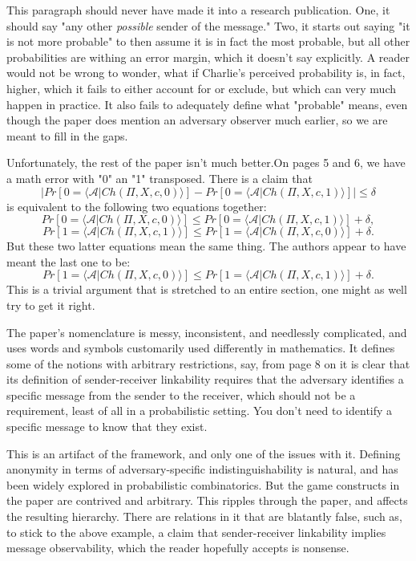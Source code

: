 \documentclass{article}
\begin{document}
\bigskip

This paragraph should never have made it into a research publication. One, it should say "any other \textit{possible} sender of the message." Two, it starts out saying "it is not more probable" to then assume it is in fact the most probable, but all other probabilities are withing an error margin, which it doesn't say explicitly. A reader would not be wrong to wonder, what if Charlie's perceived probability is, in fact, higher, which it fails to either account for or exclude, but which can very much happen in practice. It also fails to adequately define what "probable" means, even though the paper does mention an adversary observer much earlier, so we are meant to fill in the gaps. 

Unfortunately, the rest of the paper isn't much better.On pages 5 and 6, we have a math error with "0" an "1" transposed. There is a claim that $$\left| Pr[0=\langle\mathcal{A}|Ch(\Pi,X,c,0) \rangle]-Pr[0=\langle\mathcal{A}|Ch(\Pi,X,c,1) \rangle]\right|\leq\delta$$ is equivalent to the following two equations together: $$ Pr[0=\langle\mathcal{A}|Ch(\Pi,X,c,0) \rangle]\leq Pr[0=\langle\mathcal{A}|Ch(\Pi,X,c,1) \rangle]+\delta,$$
$$ Pr[1=\langle\mathcal{A}|Ch(\Pi,X,c,1) \rangle]\leq Pr[1=\langle\mathcal{A}|Ch(\Pi,X,c,0) \rangle]+\delta.$$ But these two latter equations mean the same thing. The authors appear to have meant the last one to be:  $$ Pr[1=\langle\mathcal{A}|Ch(\Pi,X,c,0) \rangle]\leq Pr[1=\langle\mathcal{A}|Ch(\Pi,X,c,1) \rangle]+\delta.$$ This is a trivial argument that is stretched to an entire section, one might as well try to get it right. \medskip

\noindent The paper's nomenclature is messy, inconsistent, and needlessly complicated, and uses words and symbols customarily used differently in mathematics. It defines some of the notions with arbitrary restrictions, say, from page 8 on it is clear that its definition of sender-receiver linkability requires that the adversary identifies a specific message from the sender to the receiver, which should not be a requirement, least of all in a probabilistic setting. You don't need to identify a specific message to know that they exist.

This is an artifact of the framework, and only one of the issues with it. Defining anonymity in terms of adversary-specific indistinguishability is natural, and has been widely explored in probabilistic combinatorics. But the game constructs in the paper are contrived and arbitrary. This ripples through the paper, and affects the resulting hierarchy. There are relations in it that are blatantly false, such as, to stick to the above example, a claim that sender-receiver linkability implies message observability, which the reader hopefully accepts is nonsense.
\end{document}
